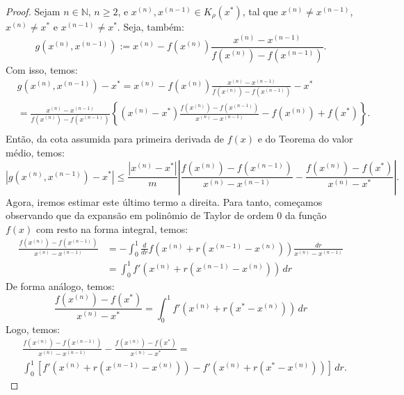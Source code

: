 \begin{proof}
  Sejam $n\in\mathbb{N}$, $n\geq 2$, e $x^{(n)}, x^{(n-1)}\in K_\rho(x^*)$, tal que $x^{(n)}\neq x^{(n-1)}$, $x^{(n)}\neq x^*$ e $x^{(n-1)}\neq x^*$. Seja, também:
  \begin{equation*}
    g(x^{(n)},x^{(n-1)}) := x^{(n)} - f(x^{(n)})\frac{x^{(n)} - x^{(n-1)}}{f(x^{(n)}) - f(x^{(n-1)})}.
  \end{equation*}
Com isso, temos:
  \begin{align*}
    &g(x^{(n)},x^{(n-1)}) - x^* = x^{(n)} - f(x^{(n)})\frac{x^{(n)} - x^{(n-1)}}{f(x^{(n)}) - f(x^{(n-1)})} - x^*\\
    &= \frac{x^{(n)} - x^{(n-1)}}{f(x^{(n)}) - f(x^{(n-1)})}\left\{(x^{(n)} - x^*)\frac{f(x^{(n)}) - f(x^{(n-1)})}{x^{(n)} - x^{(n-1)}} - f(x^{(n)}) + f(x^*)\right\}.\\
  \end{align*}
Então, da cota assumida para primeira derivada de $f(x)$ e do Teorema do valor médio, temos: 
\begin{equation}\label{eq:secantes-est0}
  |g(x^{(n)},x^{(n-1)}) - x^*| \leq \frac{|x^{(n)} - x^*|}{m}\left|\frac{f(x^{(n)}) - f(x^{(n-1)})}{x^{(n)} - x^{(n-1)}} - \frac{f(x^{(n)}) - f(x^*)}{x^{(n)} - x^*}\right|.
\end{equation}
Agora, iremos estimar este último termo a direita. Para tanto, começamos observando que da expansão em polinômio de Taylor de ordem $0$ da função $f(x)$ com resto na forma integral, temos:
\begin{align*}
  \frac{f(x^{(n)}) - f(x^{(n-1)})}{x^{(n)} - x^{(n-1)}} &= -\int_0^1 \frac{d}{dr}f(x^{(n)} + r(x^{(n-1)} - x^{(n)}))\frac{dr}{x^{(n)} - x^{(n-1)}}\\
  &= \int_0^1 f'(x^{(n)} + r(x^{(n-1)} - x^{(n)}))\,dr
\end{align*}
De forma análogo, temos:
\begin{equation*}
  \frac{f(x^{(n)}) - f(x^*)}{x^{(n)} - x^*} = \int_0^1 f'(x^{(n)} + r(x^* - x^{(n)}))\,dr
\end{equation*}
Logo, temos:
\begin{equation}\label{eq:secantes-0}
  \begin{split}
  &\frac{f(x^{(n)}) - f(x^{(n-1)})}{x^{(n)} - x^{(n-1)}} - \frac{f(x^{(n)}) - f(x^*)}{x^{(n)} - x^*} = \\
  &\int_0^1 \left[f'(x^{(n)} + r(x^{(n-1)} - x^{(n)})) - f'(x^{(n)} + r(x^* - x^{(n)}))\right]\,dr.    
  \end{split}
\end{equation}

\end{proof}
